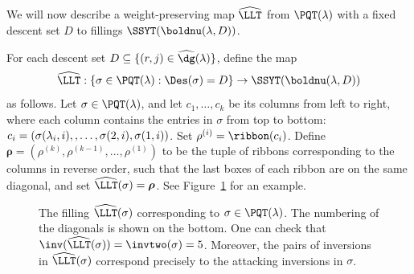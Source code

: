 We will now describe a weight-preserving map $\widehat{\LLT}$ from $\PQT(\lambda)$ with a fixed descent set $D$ to fillings $\SSYT(\boldnu(\lambda,D))$.


\begin{defn}\label{def:LLTtwo}
For each descent set $D \subseteq \{(r,j) \in \widehat{\dg}(\lambda)\}$, define the map 
\[
\widehat{\LLT}: \{\sigma\in \PQT(\lambda):\Des(\sigma)=D\} \rightarrow \SSYT(\boldnu(\lambda,D))
\] 
as follows. Let $\sigma\in\PQT(\lambda)$, and let $c_1,\ldots,c_k$ be its columns from left to right, where each column contains the entries in $\sigma$ from top to bottom: $c_i = (\sigma(\lambda_i,i),\linebreak[0],\ldots,\sigma(2,i),\sigma(1,i))$. 
Set $\rho^{(i)} = \ribbon(c_i)$. 
Define $\boldsymbol{\rho}=(\rho^{(k)},\rho^{(k-1)},\ldots,\rho^{(1)})$ to be the tuple of ribbons corresponding to the columns in reverse order, such that the last boxes of each ribbon are on the same diagonal, and set $\widehat{\LLT}(\sigma) = \boldsymbol{\rho}$. See Figure~\ref{fig:LLT_T} for an example.
\end{defn}

\begin{figure}[h]
\centering
{}
\caption{The filling $\widehat{\LLT}(\sigma)$ corresponding to $\sigma\in\PQT(\lambda)$. The numbering of the diagonals is shown on the bottom. One can check that $\inv(\widehat{\LLT}(\sigma))=\invtwo(\sigma) = 5$. Moreover, the pairs of inversions in $\widehat{\LLT}(\sigma)$
correspond precisely to the attacking inversions in $\sigma$.
}
\label{fig:LLT_T}
\end{figure}

